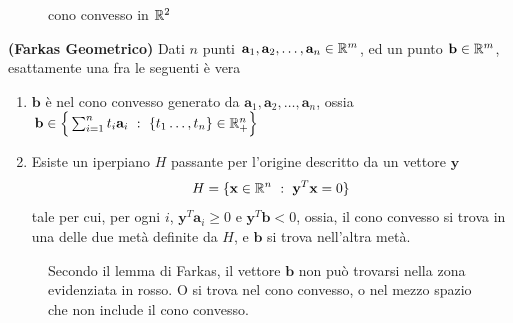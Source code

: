 \documentclass[10pt, letterpaper]{report}
\newcommand{\bb}{{\mathbf{b}}}
\newcommand{\x}{{\mathbf{x}}}
\newcommand{\y}{{\mathbf{y}}}
\begin{document}
\begin{figure}[h]
    \caption{cono convesso in ${\mathbb R}^2$}
\end{figure}

\begin{lemma2}\label{Farkas_geometrico}
    \textbf{(Farkas Geometrico)} Dati $n$ punti $\mathbf a_1,\mathbf a_2,\dots, \mathbf a_n \in {\mathbb R}^m$, ed un punto $\bb\in\R^m$, esattamente una fra le seguenti è vera\begin{enumerate}
        \item $\bb$ è nel cono convesso generato da $\mathbf a_1,\mathbf a_2,\dots, \mathbf a_n$, ossia $\bb\in \Big\{\sum_{i=1}^n t_i\mathbf a_i \ : \ \{t_1\dots,t_n\}\in\R^n_+\Big\}$
        \item Esiste un iperpiano $H$ passante per l'origine descritto da un vettore $\y$ $$ H=\{\x\in\R^n \ : \ \y^T\x=0\}$$
        tale per cui, per ogni $i$, $\y^T\mathbf a_i \ge 0$ e $\y^T\bb<0$, ossia, il cono convesso si trova in una delle due metà definite da $H$, e $\bb$ si trova nell'altra metà.
    \end{enumerate}
\end{lemma2}

\begin{figure}[h]
    \caption{Secondo il lemma di Farkas, il vettore $\bb$ non può trovarsi nella zona evidenziata in rosso. O si trova nel cono convesso, o nel mezzo spazio che non include il cono convesso.}
\end{figure}
\end{document}
